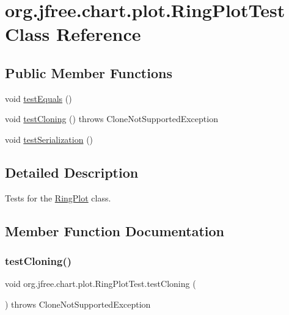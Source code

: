 \hypertarget{classorg_1_1jfree_1_1chart_1_1plot_1_1_ring_plot_test}{}\section{org.\+jfree.\+chart.\+plot.\+Ring\+Plot\+Test Class Reference}
\label{classorg_1_1jfree_1_1chart_1_1plot_1_1_ring_plot_test}
\subsection*{Public Member Functions}
\begin{DoxyCompactItemize}
\item 
void \mbox{\hyperlink{classorg_1_1jfree_1_1chart_1_1plot_1_1_ring_plot_test_ac4d78f05484500c90c96e79875ff6cc7}{test\+Equals}} ()
\item 
void \mbox{\hyperlink{classorg_1_1jfree_1_1chart_1_1plot_1_1_ring_plot_test_acf29b2fca769e44926ee3199ff9bf7e4}{test\+Cloning}} ()  throws Clone\+Not\+Supported\+Exception 
\item 
void \mbox{\hyperlink{classorg_1_1jfree_1_1chart_1_1plot_1_1_ring_plot_test_a4a541fcfb6b0664dd5d100d7841faecf}{test\+Serialization}} ()
\end{DoxyCompactItemize}


\subsection{Detailed Description}
Tests for the \mbox{\hyperlink{classorg_1_1jfree_1_1chart_1_1plot_1_1_ring_plot}{Ring\+Plot}} class. 

\subsection{Member Function Documentation}
\mbox{\label{classorg_1_1jfree_1_1chart_1_1plot_1_1_ring_plot_test_acf29b2fca769e44926ee3199ff9bf7e4}} 
\subsubsection{\texorpdfstring{test\+Cloning()}{testCloning()}}
{\footnotesize\ttfamily void org.\+jfree.\+chart.\+plot.\+Ring\+Plot\+Test.\+test\+Cloning (\begin{DoxyParamCaption}{ }\end{DoxyParamCaption}) throws Clone\+Not\+Supported\+Exception}

